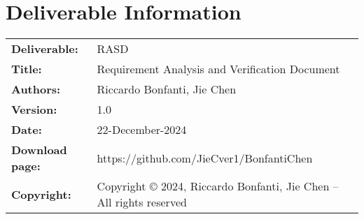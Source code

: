 \documentclass{util/polimi_3i}
\begin{document}


\pagestyle{empty} %
\frontmatter %




\startpreamble %
\setcounter{page}{1} %

\chapter*{Deliverable Information} 
\begin{table}[h!]
    \begin{tabu} to \textwidth { X[0.3,r,p] X[0.7,l,p] }
    \hline
    \textbf{Deliverable:} & RASD\\
    \textbf{Title:} & Requirement Analysis and Verification Document \\
    \textbf{Authors:} & Riccardo Bonfanti, Jie Chen \\
    \textbf{Version:} & 1.0 \\ 
    \textbf{Date:} & 22-December-2024 \\
    \textbf{Download page:} & https://github.com/JieCver1/BonfantiChen \\
    \textbf{Copyright:} & Copyright © 2024, Riccardo Bonfanti, Jie Chen – All rights reserved \\
    \hline
    \end{tabu}
    \end{table}
    
\end{document}
